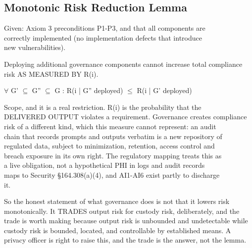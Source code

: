\subsection{Monotonic Risk Reduction Lemma}


\begin{clem}
\begin{claddisp}
Given: Axiom 3 preconditions P1-P3, and that all components are\\
correctly implemented (no implementation defects that introduce\\
new vulnerabilities).\\
\end{claddisp}
Deploying additional governance components cannot increase total compliance risk AS MEASURED BY R(i).

\begin{claddisp}
$\forall$ G' $\subseteq$ G'' $\subseteq$ G : R(i | G'' deployed) $\leq$ R(i | G' deployed)\\
\end{claddisp}
\begin{claddisp}
Scope, and it is a real restriction. R(i) is the probability that the\\
DELIVERED OUTPUT violates a requirement. Governance creates compliance\\
risk of a different kind, which this measure cannot represent: an audit\\
chain that records prompts and outputs verbatim is a new repository of\\
regulated data, subject to minimization, retention, access control and\\
breach exposure in its own right. The regulatory mapping treats this as\\
a live obligation, not a hypothetical \textemdash{} PHI in logs and audit records\\
maps to Security \S{}164.308(a)(4), and AI1-AI6 exist partly to discharge\\
it.\\
\end{claddisp}
So the honest statement of what governance does is not that it lowers risk monotonically. It TRADES output risk for custody risk, deliberately, and the trade is worth making because output risk is unbounded and undetectable while custody risk is bounded, located, and controllable by established means. A privacy officer is right to raise this, and the trade is the answer, not the lemma.

\end{clem}

